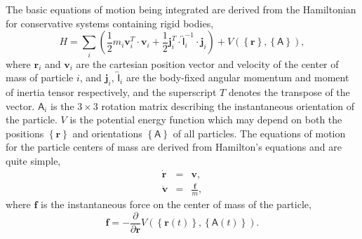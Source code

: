 \documentclass[]{book}
\begin{document}
The basic equations of motion being integrated are derived from the
Hamiltonian for conservative systems containing rigid bodies,
\begin{equation}
H = \sum_{i} \left( \frac{1}{2} m_i \mathbf{v}_i^T \cdot \mathbf{v}_i +
\frac{1}{2} \mathbf{j}_i^T \cdot \overleftrightarrow{\mathsf{I}}_i^{-1} \cdot
\mathbf{j}_i \right) +
V\left(\left\{\mathbf{r}\right\}, \left\{\mathsf{A}\right\}\right),
\end{equation}
where $\mathbf{r}_i$ and $\mathbf{v}_i$ are the cartesian position vector
and velocity of the center of mass of particle $i$, and $\mathbf{j}_i$,
$\overleftrightarrow{\mathsf{I}}_i$ are the body-fixed angular
momentum and moment of inertia tensor respectively, and the
superscript $T$ denotes the transpose of the vector.  $\mathsf{A}_i$
is the $3 \times 3$ rotation matrix describing the instantaneous
orientation of the particle.  $V$ is the potential energy function
which may depend on both the positions $\left\{\mathbf{r}\right\}$ and
orientations $\left\{\mathsf{A}\right\}$ of all particles.  The
equations of motion for the particle centers of mass are derived from
Hamilton's equations and are quite simple,
\begin{eqnarray}
\dot{\mathbf{r}} & = & \mathbf{v}, \\
\dot{\mathbf{v}} & = & \frac{\mathbf{f}}{m},
\end{eqnarray}
where $\mathbf{f}$ is the instantaneous force on the center of mass
of the particle,
\begin{equation}
\mathbf{f} = - \frac{\partial}{\partial
\mathbf{r}} V(\left\{\mathbf{r}(t)\right\}, \left\{\mathsf{A}(t)\right\}).
\end{equation}
\end{document}
